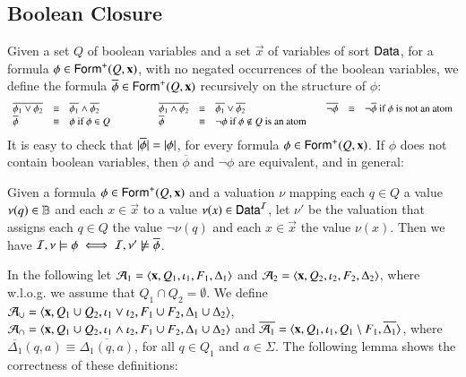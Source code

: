 \documentclass{llncs}
\begin{document}
\subsection{Boolean Closure}

Given a set $Q$ of boolean variables and a set $\vec{x}$ of variables
of sort $\mathsf{Data}$, for a formula $\phi \in \mathsf{Form}^+(Q,\mathbf x)$, with no
negated occurrences of the boolean variables, we define the formula
$\overline{\phi} \in \mathsf{Form}^+(Q,\mathbf x)$ recursively on the structure
of $\phi$:
\[\begin{array}{lclclclclcl}
\overline{\phi_1 \vee \phi_2} & \equiv & \overline{\phi_1} \wedge \overline{\phi_2} && 
\overline{\phi_1 \wedge \phi_2} & \equiv & \overline{\phi_1} \vee \overline{\phi_2} && 
\overline{\neg\phi} & \equiv & \neg \overline{\phi} \text{ if $\phi$ is not an atom} \\
\overline{\phi} & \equiv & \phi \text{  if $\phi \in Q$}\hspace*{1cm} &&
\overline{\phi} & \equiv & \neg\phi \text{  if $\phi \not\in Q$ is an atom}
\end{array}\]
It is easy to check that ${|{\overline{\phi}}|} = {|{\phi}|}$, for
every formula $\phi \in \mathsf{Form}^+(Q,\mathbf x)$. If $\phi$ does not
contain boolean variables, then $\overline{\phi}$ and $\neg\phi$ are
equivalent, and in general:

\begin{proposition}\label{prop:overline}
  Given a formula $\phi \in \mathsf{Form}^+(Q,\mathbf x)$ and a valuation $\nu$
  mapping each $q \in Q$ a value $\nu(q) \in \mathbb{B}$ and each $x \in
  \vec{x}$ to a value $\nu(x) \in \mathsf{Data}^{\mathcal{I}}$, let $\nu'$ be the
  valuation that assigns each $q \in Q$ the value $\neg\nu(q)$ and
  each $x \in \vec{x}$ the value $\nu(x)$. Then we have 
  $\mathcal{I},\nu \models \phi \iff \mathcal{I},\nu' \not\models \overline{\phi}$. 
\end{proposition}

In the following let $\mathcal{A}_1 = \left\langle \mathbf x,Q_1,\iota_1,F_1,\Delta_1 \right\rangle$
and $\mathcal{A}_2 = \left\langle \mathbf x,Q_2,\iota_2,F_2,\Delta_2 \right\rangle$, where
w.l.o.g. we assume that $Q_1 \cap Q_2 = \emptyset$. We define $\mathcal{A}_\cup
= \left\langle \mathbf x,Q_1\cup Q_2,\iota_1 \vee \iota_2,F_1\cup
  F_2,\Delta_1\cup\Delta_2 \right\rangle$, $\mathcal{A}_\cap = \left\langle \mathbf x,Q_1\cup
  Q_2,\iota_1 \wedge \iota_2, F_1\cup F_2, \Delta_1\cup\Delta_2 \right\rangle$ and
$\overline{\mathcal{A}_1} = \langle \mathbf x,Q_1,\iota_1,Q_1\setminus
F_1,\overline{\Delta_1} \rangle$, where $\overline{\Delta_1}(q,a)
\equiv \overline{\Delta_1(q,a)}$, for all $q \in Q_1$ and $a \in
\Sigma$. The following lemma shows the correctness of these
definitions: 
\end{document}
